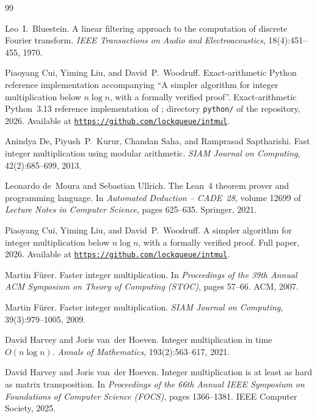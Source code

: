 \documentclass[11pt]{article}
\theoremstyle{definition}
\begin{document}
\begin{thebibliography}{99}
\footnotesize
\setlength{\itemsep}{0pt}\setlength{\parsep}{0pt}\setlength{\parskip}{0pt}

Leo~I.\ Bluestein.
\newblock A linear filtering approach to the computation of discrete Fourier transform.
\newblock \emph{IEEE Transactions on Audio and Electroacoustics}, 18(4):451--455, 1970.

Piaoyang Cui, Yiming Liu, and David~P.\ Woodruff.
\newblock Exact-arithmetic Python reference implementation accompanying ``A simpler algorithm for integer multiplication below $n \log n$, with a formally verified proof''.
\newblock Exact-arithmetic Python~3.13 reference implementation of ; directory \texttt{python/} of the repository, 2026.
\newblock Available at \href{https://github.com/lockqueue/intmul}{\texttt{https://github.com/lockqueue/intmul}}.

Anindya De, Piyush~P.\ Kurur, Chandan Saha, and Ramprasad Saptharishi.
\newblock Fast integer multiplication using modular arithmetic.
\newblock \emph{SIAM Journal on Computing}, 42(2):685--699, 2013.

Leonardo de~Moura and Sebastian Ullrich.
\newblock The Lean~4 theorem prover and programming language.
\newblock In \emph{Automated Deduction -- CADE~28}, volume 12699 of \emph{Lecture Notes in Computer Science}, pages 625--635. Springer, 2021.

Piaoyang Cui, Yiming Liu, and David~P.\ Woodruff.
\newblock A simpler algorithm for integer multiplication below $n \log n$, with a formally verified proof.
\newblock Full paper, 2026.
\newblock Available at \href{https://github.com/lockqueue/intmul}{\texttt{https://github.com/lockqueue/intmul}}.

Martin F\"urer.
\newblock Faster integer multiplication.
\newblock In \emph{Proceedings of the 39th Annual ACM Symposium on Theory of Computing (STOC)}, pages 57--66. ACM, 2007.

Martin F\"urer.
\newblock Faster integer multiplication.
\newblock \emph{SIAM Journal on Computing}, 39(3):979--1005, 2009.

David Harvey and Joris van~der Hoeven.
\newblock Integer multiplication in time $O(n \log n)$.
\newblock \emph{Annals of Mathematics}, 193(2):563--617, 2021.

David Harvey and Joris van~der Hoeven.
\newblock Integer multiplication is at least as hard as matrix transposition.
\newblock In \emph{Proceedings of the 66th Annual IEEE Symposium on Foundations of Computer Science (FOCS)}, pages 1366--1381. IEEE Computer Society, 2025.


\end{thebibliography}
\end{document}
